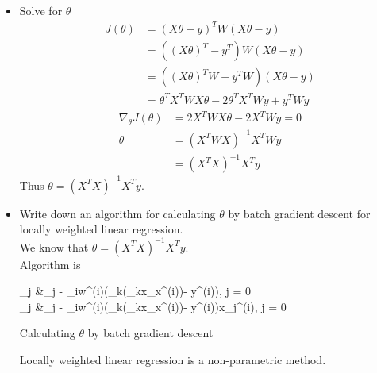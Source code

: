 \documentclass{article}
\begin{document}
\begin{itemize}
\item Solve for $\theta$\\
\begin{align*}
     J(\theta) &= (X \theta - y)^{T}W(X\theta - y)\\
     &= ((X \theta)^{T} - y^{T})W(X\theta - y)\\
     &= ((X \theta)^{T}W - y^{T}W)(X\theta - y)\\
     &= \theta^{T}X^{T}WX\theta - 2\theta^{T}X^{T}Wy + y^{T}Wy
\end{align*}
\begin{align*}
    \nabla_{\theta} J(\theta) &= 2X^{T}WX\theta - 2X^{T}Wy = 0\\
    \theta &= (X^{T}WX)^{-1}X^{T}Wy\\
    &= (X^{T}X)^{-1}X^{T}y
\end{align*}
Thus $\theta= (X^{T}X)^{-1}X^{T}y$.\\
\item Write down an algorithm for calculating $\theta$ by batch gradient descent for locally weighted linear regression.\\
We know that $\theta= (X^{T}X)^{-1}X^{T}y$.\\
Algorithm is\\
\begin{algorithm}[H]
\DontPrintSemicolon
  
  \KwOutput{\theta}
        { 
                \theta_{j} &\gets \theta_{j} - \alpha \sum_{i}w^{(i)}(\sum_{k}(\theta_{k}x_{x}^{(i)})- y^{(i)}), j = 0\\
        	    \theta_{j} &\gets \theta_{j} - \alpha \sum_{i}w^{(i)}(\sum_{k}(\theta_{k}x_{x}^{(i)})- y^{(i)})x_{j}^{(i)}, j \not= 0
        }
\caption{Calculating $\theta$ by batch gradient descent}
\end{algorithm}
Locally weighted linear regression is a non-parametric method. 
\end{itemize}
\end{document}
